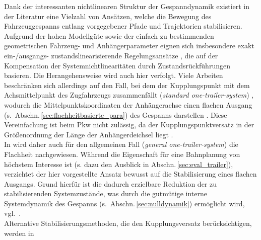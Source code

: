 Dank der interessanten nichtlinearen Struktur der Gespanndynamik existiert in der Literatur eine Vielzahl von Ansätzen, welche die Bewegung des Fahrzeuggespanns entlang vorgegebener Pfade und Trajektorien stabilisieren. Aufgrund der hohen Modellgüte sowie der einfach zu bestimmenden geometrischen Fahrzeug- und Anhängerparameter eignen sich insbesondere exakt ein-/\-ausgangs- \bzw zustandslinearisierende Regelungsansätze \cite{allgower1993nichtlinearer, rothfuss1997fnz}, die auf der Kompensation der Systemnichtlinearitäten durch Zustandsrückführungen basieren. Die Herangehensweise wird auch hier verfolgt. Viele Arbeiten beschränken sich allerdings auf den Fall, bei dem der Kupplungspunkt mit dem Achsmittelpunkt des Zugfahrzeugs zusammenfällt (\emph{standard one-trailer-system}) \cite{tilbury1992steering, rouchon1993flatness2, sampei1995arbitrary}, wodurch die Mittel\-punkts\-koor\-di\-na\-ten der Anhängerachse einen flachen Ausgang (s.\ Abschn.\,\ref{sec:flachheitbasierte_para}) des Gespanns darstellen \cite{rouchon1993flatness1}. Diese Vereinfachung ist beim Pkw nicht zulässig, da der Kupplungspunktversatz %
in der Größenordnung der Länge der Anhängerdeichsel liegt \cite{altafini2001some}. \\
In \cite{rouchon1993flatness1} wird daher auch für den allgemeinen Fall (\emph{general one-trailer-system}) die Flachheit nachgewiesen. Während die Eigenschaft für eine Bahnplanung von höchstem Interesse ist (s. dazu den Ausblick in Abschn.\,\ref{sec:eval_trailer}), verzichtet der hier vorgestellte Ansatz bewusst auf die Stabilisierung eines flachen Ausgangs. Grund hierfür ist die dadurch erzielbare Reduktion der zu stabilisierenden Systemzustände, was durch die %
gutmütige interne Systemdynamik des Gespanns (s.\ Abschn.\,\ref{sec:nulldynamik}) ermöglicht wird, vgl.\ \cite{Werling2010a}. \\ %
Alternative Stabilisierungsmethoden, die den Kupplungsversatz berücksichtigen, werden in
\cite{pradalier2008robust,  %
schwarz2009generisches, %
gonzalez2009backing} %
